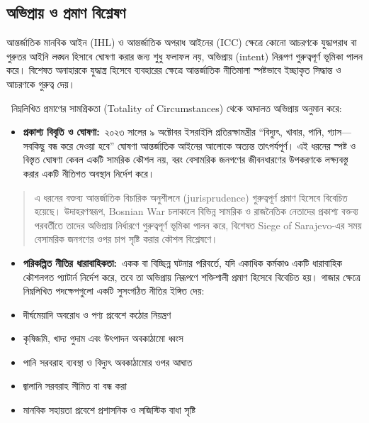 \subsection{\texorpdfstring{অভিপ্রায় ও প্রমাণ বিশ্লেষণ
}{৩.৫ অভিপ্রায় ও প্রমাণ বিশ্লেষণ }}\label{ux985ux9adux9aaux9b0ux9df-ux993-ux9aaux9b0ux9aeux9a3-ux9acux9b6ux9b2ux9b7ux9a3}

আন্তর্জাতিক মানবিক আইন (IHL) ও আন্তর্জাতিক অপরাধ আইনের (ICC) ক্ষেত্রে কোনো
আচরণকে যুদ্ধাপরাধ বা গুরুতর আইনি লঙ্ঘন হিসাবে ঘোষণা করার জন্য শুধু ফলাফল নয়,
অভিপ্রায় (intent) নিরূপণ গুরুত্বপূর্ণ ভূমিকা পালন করে। বিশেষত অনাহারকে যুদ্ধাস্ত্র
হিসেবে ব্যবহারের ক্ষেত্রে আন্তর্জাতিক নীতিমালা স্পষ্টভাবে ইচ্ছাকৃত সিদ্ধান্ত ও
আচরণকে গুরুত্ব দেয়।

~নিম্নলিখিত প্রমাণের সামগ্রিকতা (Totality of Circumstances) থেকে আদালত
অভিপ্রায় অনুমান করে:

\begin{itemize}
\item
  \textbf{প্রকাশ্য বিবৃতি ও ঘোষণা:}~২০২৩ সালের ৯ অক্টোবর ইসরাইলি
  প্রতিরক্ষামন্ত্রীর ``বিদ্যুৎ, খাবার, পানি, গ্যাস---সবকিছু বন্ধ করে দেওয়া হবে''
  ঘোষণা আন্তর্জাতিক আইনের আলোকে অত্যন্ত তাৎপর্যপূর্ণ। এই ধরনের স্পষ্ট ও বিস্তৃত
  ঘোষণা কেবল একটি সামরিক কৌশল নয়, বরং বেসামরিক জনগণের জীবনধারণের উপকরণকে
  লক্ষ্যবস্তু করার একটি নীতিগত অবস্থান নির্দেশ করে।
\end{itemize}

\begin{quote}
এ ধরনের বক্তব্য আন্তর্জাতিক বিচারিক অনুশীলনে (jurisprudence) গুরুত্বপূর্ণ প্রমাণ
হিসেবে বিবেচিত হয়েছে। উদাহরণস্বরূপ, Bosnian War চলাকালে বিভিন্ন সামরিক ও
রাজনৈতিক নেতাদের প্রকাশ্য বক্তব্য পরবর্তীতে তাদের অভিপ্রায় নির্ধারণে গুরুত্বপূর্ণ
ভূমিকা পালন করে, বিশেষত Siege of Sarajevo-এর সময় বেসামরিক জনগণের ওপর চাপ
সৃষ্টি করার কৌশল বিশ্লেষণে।
\end{quote}

\begin{itemize}
\item
  \textbf{পরিকল্পিত নীতির ধারাবাহিকতা:}~একক বা বিচ্ছিন্ন ঘটনার পরিবর্তে, যদি
  একাধিক কর্মকাণ্ড একটি ধারাবাহিক কৌশলগত প্যাটার্ন নির্দেশ করে, তবে তা
  অভিপ্রায় নিরূপণে শক্তিশালী প্রমাণ হিসেবে বিবেচিত হয়। গাজার ক্ষেত্রে
  নিম্নলিখিত পদক্ষেপগুলো একটি সুসংগঠিত নীতির ইঙ্গিত দেয়:
\end{itemize}

\begin{itemize}
\item
  দীর্ঘমেয়াদি অবরোধ ও পণ্য প্রবেশে কঠোর নিয়ন্ত্রণ
\item
  কৃষিজমি, খাদ্য গুদাম এবং উৎপাদন অবকাঠামো ধ্বংস
\item
  পানি সরবরাহ ব্যবস্থা ও বিদ্যুৎ অবকাঠামোর ওপর আঘাত
\item
  জ্বালানি সরবরাহ সীমিত বা বন্ধ করা
\item
  মানবিক সহায়তা প্রবেশে প্রশাসনিক ও লজিস্টিক বাধা সৃষ্টি
\end{itemize}

